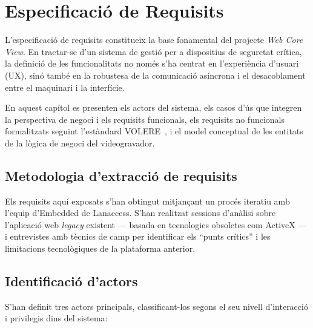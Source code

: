 \chapter{Especificació de Requisits}
\label{ch:requisits}

L'especificació de requisits constitueix la base fonamental del projecte \textit{Web Core View}. En tractar-se d'un sistema de gestió per a dispositius de seguretat crítica, la definició de les funcionalitats no només s'ha centrat en l'experiència d'usuari (UX), sinó també en la robustesa de la comunicació asíncrona i el desacoblament entre el maquinari i la interfície.

En aquest capítol es presenten els actors del sistema, els casos d'ús que integren la perspectiva de negoci i els requisits funcionals, els requisits no funcionals formalitzats seguint l'estàndard VOLERE~\cite{volere_robertson}, i el model conceptual de les entitats de la lògica de negoci del videogravador.

\section{Metodologia d'extracció de requisits}
Els requisits aquí exposats s'han obtingut mitjançant un procés iteratiu amb l'equip d'Embedded de Lanaccess. S'han realitzat sessions d'anàlisi sobre l'aplicació web \textit{legacy} existent --- basada en tecnologies obsoletes com ActiveX --- i entrevistes amb tècnics de camp per identificar els ``punts crítics'' i les limitacions tecnològiques de la plataforma anterior.

\section{Identificació d'actors}
\label{sec:actors}
S'han definit tres actors principals, classificant-los segons el seu nivell d'interacció i privilegis dins del sistema:

